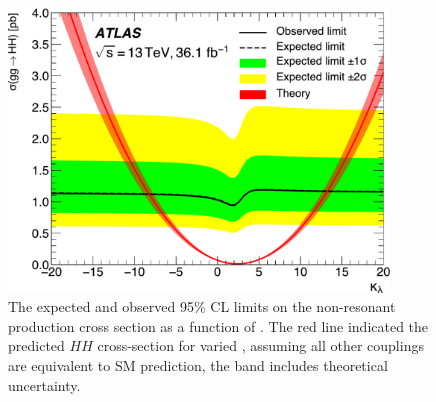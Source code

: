 \begin{figure}[htbp]
  \centering
\includegraphics[width=0.9\textwidth]{chapters/chapter5_yybb/images/limits/lambda.pdf}
\caption[The expected and observed limits on the non-resonant \HH production cross section as a function of \klambda]
{The expected and observed 95\% \gls{CL} limits on the non-resonant \HH production cross section as a function of \klambda. The red line indicated the predicted $HH$ cross-section for varied \klambda, assuming all other couplings are equivalent to \gls{SM} prediction, the band includes theoretical uncertainty.} 
\label{fig:limits-klambda}
\end{figure}